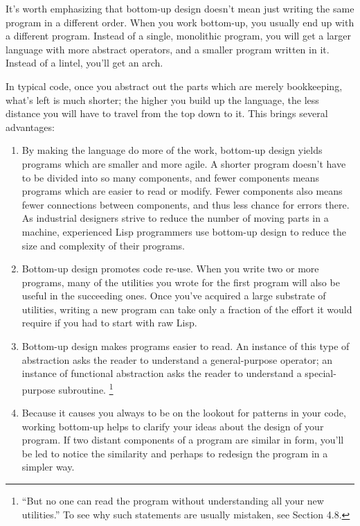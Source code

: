 \documentclass[12pt]{book}
\begin{document}
It's worth emphasizing that bottom-up design doesn't mean just writing
the same program in a different order. When you work bottom-up, you
usually end up with a different program. Instead of a single, monolithic
program, you will get a larger language with more abstract operators,
and a smaller program written in it. Instead of a lintel, you'll get an
arch.

In typical code, once you abstract out the parts which are merely
bookkeeping, what's left is much shorter; the higher you build up the
language, the less distance you will have to travel from the top down to
it. This brings several advantages:

\begin{enumerate}
\def\labelenumi{\arabic{enumi}.}
\item
  By making the language do more of the work, bottom-up design yields
  programs which are smaller and more agile. A shorter program doesn't
  have to be divided into so many components, and fewer components means
  programs which are easier to read or modify. Fewer components also
  means fewer connections between components, and thus less chance for
  errors there. As industrial designers strive to reduce the number of
  moving parts in a machine, experienced Lisp programmers use bottom-up
  design to reduce the size and complexity of their programs.
\item
  Bottom-up design promotes code re-use. When you write two or more
  programs, many of the utilities you wrote for the first program will
  also be useful in the succeeding ones. Once you've acquired a large
  substrate of utilities, writing a new program can take only a fraction
  of the effort it would require if you had to start with raw Lisp.
\item
  Bottom-up design makes programs easier to read. An instance of this
  type of abstraction asks the reader to understand a general-purpose
  operator; an instance of functional abstraction asks the reader to
  understand a special-purpose subroutine. \footnote{``But no one can read the program without understanding all your
new utilities.'' To see why such statements are usually mistaken, see
Section 4.8.}
\item
  Because it causes you always to be on the lookout for patterns in your
  code, working bottom-up helps to clarify your ideas about the design
  of your program. If two distant components of a program are similar in
  form, you'll be led to notice the similarity and perhaps to redesign
  the program in a simpler way.
\end{enumerate}
\end{document}
